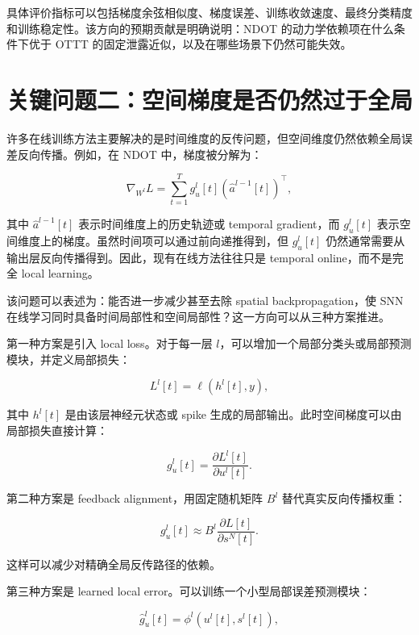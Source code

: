 \documentclass[11pt]{ctexart}
\begin{document}
具体评价指标可以包括梯度余弦相似度、梯度误差、训练收敛速度、最终分类精度和训练稳定性。该方向的预期贡献是明确说明：NDOT 的动力学依赖项在什么条件下优于 OTTT 的固定泄露近似，以及在哪些场景下仍然可能失效。

\section{关键问题二：空间梯度是否仍然过于全局}

许多在线训练方法主要解决的是时间维度的反传问题，但空间维度仍然依赖全局误差反向传播。例如，在 NDOT 中，梯度被分解为：

\begin{equation}
\nabla_{W^l}L
=
\sum_{t=1}^{T}
 g_u^l[t]
\left(\hat a^{l-1}[t]\right)^\top ,
\end{equation}

其中 $\hat a^{l-1}[t]$ 表示时间维度上的历史轨迹或 temporal gradient，而 $g_u^l[t]$ 表示空间维度上的梯度。虽然时间项可以通过前向递推得到，但 $g_u^l[t]$ 仍然通常需要从输出层反向传播得到。因此，现有在线方法往往只是 temporal online，而不是完全 local learning。

该问题可以表述为：能否进一步减少甚至去除 spatial backpropagation，使 SNN 在线学习同时具备时间局部性和空间局部性？这一方向可以从三种方案推进。

第一种方案是引入 local loss。对于每一层 $l$，可以增加一个局部分类头或局部预测模块，并定义局部损失：

\begin{equation}
L^l[t] = \ell(h^l[t], y),
\end{equation}

其中 $h^l[t]$ 是由该层神经元状态或 spike 生成的局部输出。此时空间梯度可以由局部损失直接计算：

\begin{equation}
 g_u^l[t]
=
\frac{\partial L^l[t]}{\partial u^l[t]} .
\end{equation}

第二种方案是 feedback alignment，用固定随机矩阵 $B^l$ 替代真实反向传播权重：

\begin{equation}
 g_u^l[t]
\approx
B^l
\frac{\partial L[t]}{\partial s^N[t]} .
\end{equation}

这样可以减少对精确全局反传路径的依赖。

第三种方案是 learned local error。可以训练一个小型局部误差预测模块：

\begin{equation}
\hat g_u^l[t]
=
\phi^l(u^l[t],s^l[t]),
\end{equation}
\end{document}

